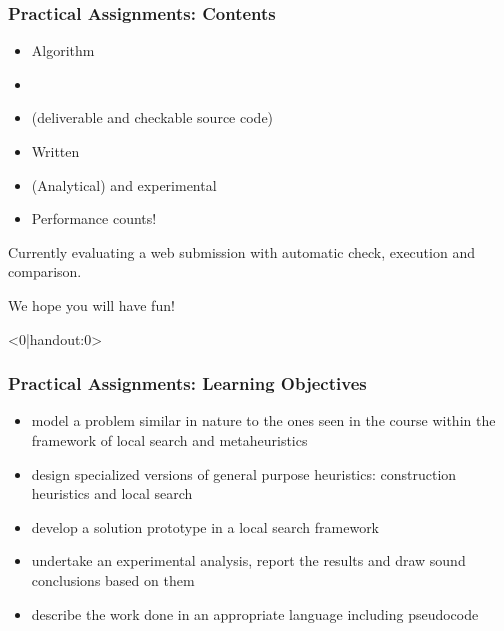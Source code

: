 \documentclass[handout,usepdftitle=false,aspectratio=169,smaller,compress,sans,fleqn,xcolor=dvipsnames,fleqn,table]{beamer}
\begin{document}
\begin{frame}%
  \frametitle{Practical Assignments: Contents}



  \medskip\begin{itemize}\itemsep=3ex
\item Algorithm 
\item {}
\item {} (deliverable and checkable source code)
\item Written 
\item (Analytical) and experimental 
\item Performance counts!
\end{itemize}

\pause
\bigskip
Currently evaluating a web submission with automatic check, execution and comparison.

\bigskip
We hope you will have fun!
\end{frame}






\begin{frame}<0|handout:0>%
  \frametitle{Practical Assignments: Learning Objectives}


\medskip
\begin{itemize}
  \itemsep=2ex
\item \alert{model} a problem similar in nature to the ones seen in the course
  within the framework of local search and metaheuristics
\item \alert{design} specialized versions of general purpose heuristics:
  construction heuristics and local search
\item \alert{develop} a solution prototype in a local search framework
\item \alert{undertake an experimental analysis}, report the results and draw
  sound conclusions based on them
\item \alert{describe} the work done in an appropriate language including pseudocode
\end{itemize}


  \end{frame}
\end{document}
